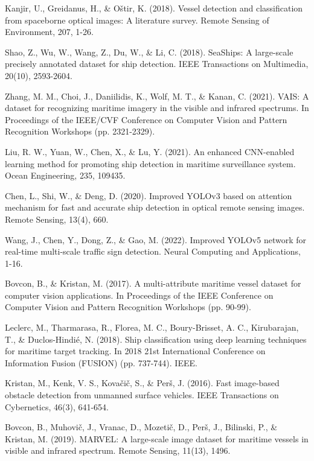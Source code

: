 \documentclass[twoside]{article}
\begin{document}
\begin{multicols}{2}
\begin{thebibliography}{99}
Kanjir, U., Greidanus, H., \& O{\v{s}}tir, K. (2018). Vessel detection and classification from spaceborne optical images: A literature survey. Remote Sensing of Environment, 207, 1-26.

Shao, Z., Wu, W., Wang, Z., Du, W., \& Li, C. (2018). SeaShips: A large-scale precisely annotated dataset for ship detection. IEEE Transactions on Multimedia, 20(10), 2593-2604.

Zhang, M. M., Choi, J., Daniilidis, K., Wolf, M. T., \& Kanan, C. (2021). VAIS: A dataset for recognizing maritime imagery in the visible and infrared spectrums. In Proceedings of the IEEE/CVF Conference on Computer Vision and Pattern Recognition Workshops (pp. 2321-2329).

Liu, R. W., Yuan, W., Chen, X., \& Lu, Y. (2021). An enhanced CNN-enabled learning method for promoting ship detection in maritime surveillance system. Ocean Engineering, 235, 109435.

Chen, L., Shi, W., \& Deng, D. (2020). Improved YOLOv3 based on attention mechanism for fast and accurate ship detection in optical remote sensing images. Remote Sensing, 13(4), 660.

Wang, J., Chen, Y., Dong, Z., \& Gao, M. (2022). Improved YOLOv5 network for real-time multi-scale traffic sign detection. Neural Computing and Applications, 1-16.

Bovcon, B., \& Kristan, M. (2017). A multi-attribute maritime vessel dataset for computer vision applications. In Proceedings of the IEEE Conference on Computer Vision and Pattern Recognition Workshops (pp. 90-99).

Leclerc, M., Tharmarasa, R., Florea, M. C., Boury-Brisset, A. C., Kirubarajan, T., \& Duclos-Hindi{\'e}, N. (2018). Ship classification using deep learning techniques for maritime target tracking. In 2018 21st International Conference on Information Fusion (FUSION) (pp. 737-744). IEEE.

Kristan, M., Kenk, V. S., Kova{\v{c}}i{\v{c}}, S., \& Per{\v{s}}, J. (2016). Fast image-based obstacle detection from unmanned surface vehicles. IEEE Transactions on Cybernetics, 46(3), 641-654.

Bovcon, B., Muhovi{\v{c}}, J., Vranac, D., Mozeti{\v{c}}, D., Per{\v{s}}, J., Bilinski, P., \& Kristan, M. (2019). MARVEL: A large-scale image dataset for maritime vessels in visible and infrared spectrum. Remote Sensing, 11(13), 1496.


\end{thebibliography}
\end{multicols}
\end{document}
